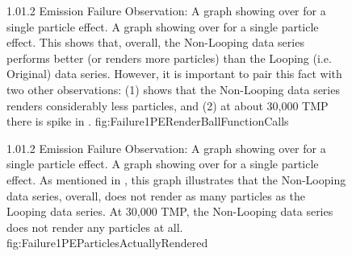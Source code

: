 \begin{figure}
\addtocounter{figure}{-1}

	\vspace{-1.5cm}
	{1.0}{1.2}
	{Emission Failure Observation: A graph showing  over  for a single particle effect.}
	{A graph showing  over  for a single particle effect. This shows that, overall, the Non-Looping data series performs better (or renders more particles) than the Looping (i.e. Original) data series. However, it is important to pair this fact with two other observations: (1)  shows that the Non-Looping data series renders considerably less particles, and (2) at about 30,000 TMP there is spike in . }
	{fig:Failure1PERenderBallFunctionCalls}

	\vspace{-0.5cm}
	{1.0}{1.2}
	{Emission Failure Observation: A graph showing  over  for a single particle effect.}
	{A graph showing  over  for a single particle effect. As mentioned in , this graph illustrates that the Non-Looping data series, overall, does not render as many particles as the Looping data series. At 30,000 TMP, the Non-Looping data series does not render any particles at all.}
	{fig:Failure1PEParticlesActuallyRendered}

\end{figure}

